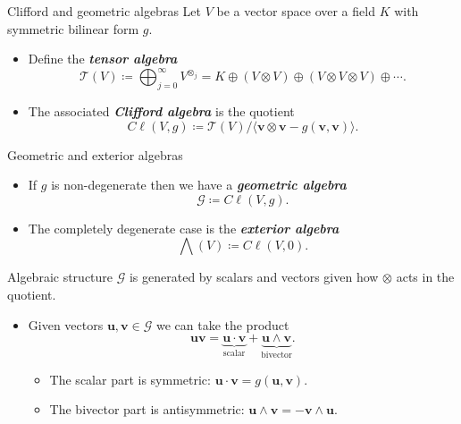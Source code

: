 \documentclass[aspectratio=169,handout]{beamer}
\newcommand\boldgreen[1]{\textcolor{lighter_csu_green}{\emph{\textbf{#1}}}}
\newcommand{\G}{\mathcal{G}}
\newcommand{\blade}[1]{\boldsymbol{#1}}
\begin{document}
\begin{frame}{Clifford and geometric algebras}
\vfill
\pause
Let $V$ be a vector space over a field $K$ with symmetric bilinear form $g$.
\begin{itemize}
        \pause
        \item Define the \boldgreen{tensor algebra}
        \[
        \mathcal{T}(V) \coloneqq \bigoplus_{j=0}^\infty V^{\otimes_j} = K \oplus (V \otimes V) \oplus (V \otimes V \otimes V) \oplus \cdots.
        \]
        \pause
        \item The associated \boldgreen{Clifford algebra} is the quotient
        \[
        C\ell(V,g) \coloneqq \mathcal{T}(V)/ \langle \blade{v} \otimes \blade{v} - g(\blade{v},\blade{v})\rangle.
        \]
\end{itemize}
\vfill
\end{frame}

\begin{frame}{Geometric and exterior algebras}
\vfill
\begin{itemize}
        \pause
        \item If $g$ is non-degenerate then we have a \boldgreen{geometric algebra}
        \[
        \G \coloneqq C\ell(V,g).
        \]
        \pause
        \item The completely degenerate case is the \boldgreen{exterior algebra}
        \[
        \bigwedge(V) \coloneqq C\ell(V,0).
        \]
\end{itemize}
\vfill
\end{frame}

\begin{frame}{Algebraic structure}
\vfill
\pause
$\G$ is generated by scalars and vectors given how $\otimes$ acts in the quotient.
\begin{itemize}
    \pause
    \item Given vectors $\blade{u}, \blade{v} \in \G$ we can take the product
    \[
    \blade{u}\blade{v} = \underbrace{\blade{u}\cdot \blade{v}}_{\textrm{scalar}} + \underbrace{\blade{u}\wedge \blade{v}}_{\textrm{bivector}}.
    \]
\begin{itemize}
    \pause
    \item The scalar part is symmetric: $\blade{u}\cdot \blade{v} = g(\blade{u},\blade{v})$.
    \pause
    \item The bivector part is antisymmetric: $\blade{u}\wedge \blade{v} = -\blade{v}\wedge \blade{u}$.
\end{itemize}
\end{itemize}
\vfill
\end{frame}
\end{document}
